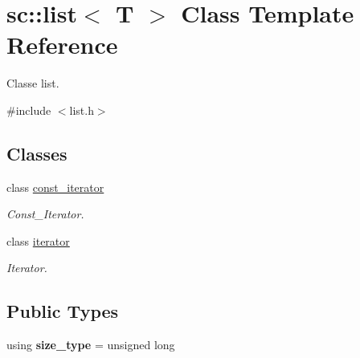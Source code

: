 \hypertarget{classsc_1_1list}{}\section{sc\+:\+:list$<$ T $>$ Class Template Reference}
\label{classsc_1_1list}


Classe list.  




{\ttfamily \#include $<$list.\+h$>$}

\subsection*{Classes}
\begin{DoxyCompactItemize}
\item 
class \hyperlink{classsc_1_1list_1_1const__iterator}{const\+\_\+iterator}
\begin{DoxyCompactList}\small\item\em Const\+\_\+\+Iterator. \end{DoxyCompactList}\item 
class \hyperlink{classsc_1_1list_1_1iterator}{iterator}
\begin{DoxyCompactList}\small\item\em Iterator. \end{DoxyCompactList}\end{DoxyCompactItemize}
\subsection*{Public Types}
\begin{DoxyCompactItemize}
\item 
\mbox{\label{classsc_1_1list_acbac64cff34d45bb9c61771493db48ec}} 
using {\bfseries size\+\_\+type} = unsigned long
\end{DoxyCompactItemize}
